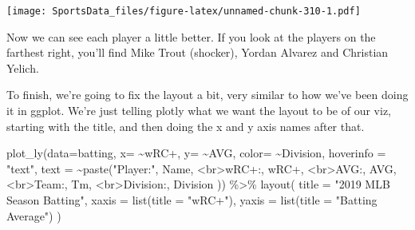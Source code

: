 \documentclass[
]{book}
\newenvironment{Shaded}{\begin{snugshade}}{\end{snugshade}}
\newcommand{\AttributeTok}[1]{\textcolor[rgb]{0.77,0.63,0.00}{#1}}
\newcommand{\FunctionTok}[1]{\textcolor[rgb]{0.00,0.00,0.00}{#1}}
\newcommand{\NormalTok}[1]{#1}
\newcommand{\SpecialCharTok}[1]{\textcolor[rgb]{0.00,0.00,0.00}{#1}}
\newcommand{\StringTok}[1]{\textcolor[rgb]{0.31,0.60,0.02}{#1}}
\begin{document}
\texttt{[image: SportsData\_files/figure-latex/unnamed-chunk-310-1.pdf]}

Now we can see each player a little better. If you look at the players on the farthest right, you'll find Mike Trout (shocker), Yordan Alvarez and Christian Yelich.

To finish, we're going to fix the layout a bit, very similar to how we've been doing it in ggplot. We're just telling plotly what we want the layout to be of our viz, starting with the title, and then doing the x and y axis names after that.

\begin{Shaded}
\begin{Highlighting}[]
\FunctionTok{plot\_ly}\NormalTok{(}\AttributeTok{data=}\NormalTok{batting, }\AttributeTok{x=} \SpecialCharTok{\textasciitilde{}}\StringTok{\textasciigrave{}}\AttributeTok{wRC+}\StringTok{\textasciigrave{}}\NormalTok{, }\AttributeTok{y=} \SpecialCharTok{\textasciitilde{}}\StringTok{\textasciigrave{}}\AttributeTok{AVG}\StringTok{\textasciigrave{}}\NormalTok{, }\AttributeTok{color=} \SpecialCharTok{\textasciitilde{}}\StringTok{\textasciigrave{}}\AttributeTok{Division}\StringTok{\textasciigrave{}}\NormalTok{,}
        \AttributeTok{hoverinfo =} \StringTok{"text"}\NormalTok{,}
        \AttributeTok{text =} \SpecialCharTok{\textasciitilde{}}\FunctionTok{paste}\NormalTok{(}\StringTok{"Player:"}\NormalTok{, Name,}
                      \StringTok{\textquotesingle{}\textless{}br\textgreater{}wRC+:\textquotesingle{}}\NormalTok{, }\StringTok{\textasciigrave{}}\AttributeTok{wRC+}\StringTok{\textasciigrave{}}\NormalTok{,}
                      \StringTok{\textquotesingle{}\textless{}br\textgreater{}AVG:\textquotesingle{}}\NormalTok{, AVG,}
                      \StringTok{\textquotesingle{}\textless{}br\textgreater{}Team:\textquotesingle{}}\NormalTok{, Tm,}
                      \StringTok{\textquotesingle{}\textless{}br\textgreater{}Division:\textquotesingle{}}\NormalTok{, Division}
\NormalTok{                      )) }\SpecialCharTok{\%\textgreater{}\%} 
  \FunctionTok{layout}\NormalTok{(}
    \AttributeTok{title =} \StringTok{"2019 MLB Season Batting"}\NormalTok{,}
    \AttributeTok{xaxis =} \FunctionTok{list}\NormalTok{(}\AttributeTok{title =} \StringTok{"wRC+"}\NormalTok{),}
    \AttributeTok{yaxis =} \FunctionTok{list}\NormalTok{(}\AttributeTok{title =} \StringTok{"Batting Average"}\NormalTok{)}
\NormalTok{  )}
\end{Highlighting}
\end{Shaded}
\end{document}
